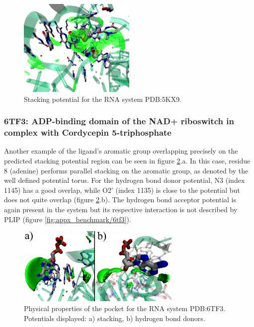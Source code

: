       \begin{figure}[H]
        \centering
        \includegraphics[width=0.5\textwidth]{figures/results/benchmark_rna/5kx9.png}
        \caption{\label{fig:benchmark/5kx9} Stacking potential for the RNA system PDB:5KX9.}
      \end{figure}

    \subsubsection{6TF3: ADP-binding domain of the NAD+ riboswitch in complex with Cordycepin 5-triphosphate}
      Another example of the ligand's aromatic group overlapping precisely on the predicted stacking potential region can be seen in figure \ref{fig:benchmark/6tf3}.a. In this case, residue 8 (adenine) performs parallel stacking on the aromatic group, as denoted by the well defined potential torus. For the hydrogen bond donor potential, N3 (index 1145) has a good overlap, while O2' (index 1135) is close to the potential but does not quite overlap (figure \ref{fig:benchmark/6tf3}.b). The hydrogen bond acceptor potential is again present in the system but its respective interaction is not described by PLIP (figure \ref{fig:appx_benchmark/6tf3}).

      \begin{figure}[H]
        \centering
        \includegraphics[width=0.7\textwidth]{figures/results/benchmark_rna/6tf3.png}
        \caption{\label{fig:benchmark/6tf3} Physical properties of the pocket for the RNA system PDB:6TF3. Potentials displayed: a) stacking, b) hydrogen bond donors.}
      \end{figure}

